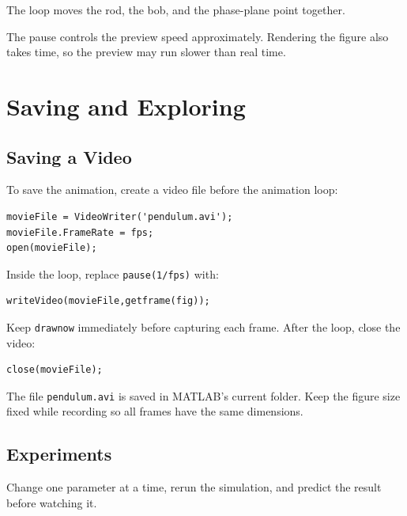 \documentclass[10pt,letterpaper]{article}
\begin{document}
The loop moves the rod, the bob, and the phase-plane
point together.

The pause controls the preview speed approximately.
Rendering the figure also takes time, so the preview
may run slower than real time.

\section{Saving and Exploring}

\subsection{Saving a Video}

To save the animation, create a video file before
the animation loop:

\begin{lstlisting}[style=lecturematlab]
movieFile = VideoWriter('pendulum.avi');
movieFile.FrameRate = fps;
open(movieFile);
\end{lstlisting}

Inside the loop, replace
\texttt{pause(1/fps)} with:

\begin{lstlisting}[style=lecturematlab]
writeVideo(movieFile,getframe(fig));
\end{lstlisting}

Keep \texttt{drawnow} immediately before capturing
each frame. After the loop, close the video:

\begin{lstlisting}[style=lecturematlab]
close(movieFile);
\end{lstlisting}

The file \texttt{pendulum.avi} is saved in MATLAB's
current folder. Keep the figure size fixed while
recording so all frames have the same dimensions.

\subsection{Experiments}

Change one parameter at a time, rerun the simulation,
and predict the result before watching it.
\end{document}
